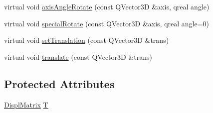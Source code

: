 \begin{DoxyCompactItemize}
\item 
virtual void \hyperlink{class_robot_model_1_1_display_list_a9a7084168997ac285ee1e9f4041a8d57}{axisAngleRotate} (const QVector3D \&axis, qreal angle)
\item 
virtual void \hyperlink{class_robot_model_1_1_display_list_abd15964fcf47dbfdcb06d89517871152}{specialRotate} (const QVector3D \&axis, qreal angle=0)
\item 
virtual void \hyperlink{class_robot_model_1_1_display_list_a6c9c1298e237ab25037ad9d7163b118c}{setTranslation} (const QVector3D \&trans)
\item 
virtual void \hyperlink{class_robot_model_1_1_display_list_a6eb574d1f9929d9e2141dbacdeeb1b6a}{translate} (const QVector3D \&trans)
\end{DoxyCompactItemize}
\subsection*{Protected Attributes}
\begin{DoxyCompactItemize}
\item 
\hyperlink{class_robot_model_1_1_displ_matrix}{DisplMatrix} \hyperlink{class_robot_model_1_1_display_list_a9058babda6102fe41186f806990aa350}{T}
\end{DoxyCompactItemize}


